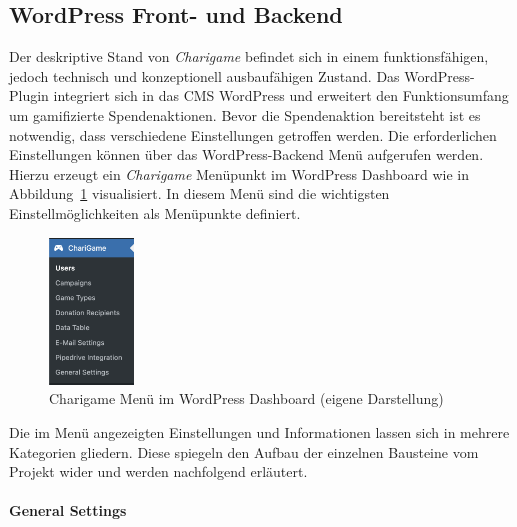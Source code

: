 \subsection{WordPress Front- und Backend}
\label{subsec:front-backend}
Der deskriptive Stand von \textit{Charigame} befindet sich in einem funktionsfähigen, jedoch technisch und konzeptionell ausbaufähigen Zustand.
Das WordPress-Plugin integriert sich in das CMS WordPress und erweitert den Funktionsumfang um gamifizierte Spendenaktionen.
Bevor die Spendenaktion bereitsteht ist es notwendig, dass verschiedene Einstellungen getroffen werden.
Die erforderlichen Einstellungen können über das WordPress-Backend Menü aufgerufen werden.
\\
Hierzu erzeugt ein \textit{Charigame} Menüpunkt im WordPress Dashboard wie in Abbildung~\ref{fig:charigame-menu-legacy} visualisiert.
In diesem Menü sind die wichtigsten Einstellmöglichkeiten als Menüpunkte definiert.
\begin{figure}[tbh]
    \centering
    \includegraphics[width=0.2\textwidth]{images/legacy_charigame_wordpress_menu}
    \caption{Charigame Menü im WordPress Dashboard (eigene Darstellung)}
    \label{fig:charigame-menu-legacy}
\end{figure}

Die im Menü angezeigten Einstellungen und Informationen lassen sich in mehrere Kategorien gliedern.
Diese spiegeln den Aufbau der einzelnen Bausteine vom Projekt wider und werden nachfolgend erläutert.
\\\\
\textbf{General Settings}


